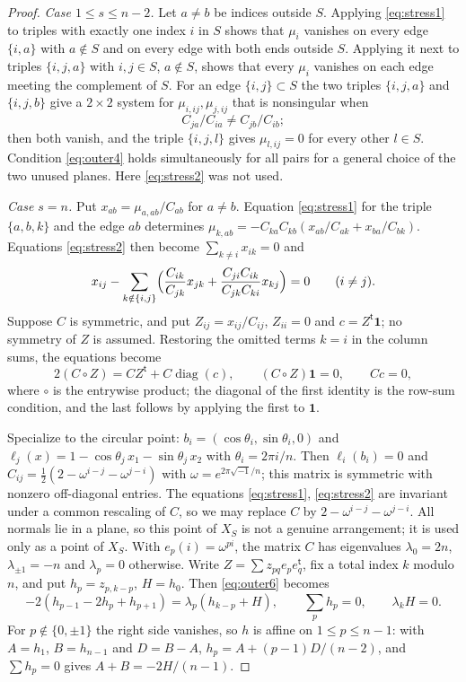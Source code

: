 \documentclass{amsart}
\theoremstyle{definition}
\theoremstyle{remark}
\numberwithin{equation}{section}
\begin{document}
\begin{proof}
\emph{Case $1\le s\le n-2$.} Let $a\ne b$ be indices outside $S$. Applying
\eqref{eq:stress1} to triples with exactly one index $i$ in $S$ shows that $\mu_i$
vanishes on every edge $\{i,a\}$ with $a\notin S$ and on every edge with both ends
outside $S$. Applying it next to triples $\{i,j,a\}$ with $i,j\in S$, $a\notin S$,
shows that every $\mu_i$ vanishes on each edge meeting the complement of $S$. For an
edge $\{i,j\}\subset S$ the two triples $\{i,j,a\}$ and $\{i,j,b\}$ give a $2\times2$
system for $\mu_{i,ij},\mu_{j,ij}$ that is nonsingular when
\begin{equation}\label{eq:outer4}
  C_{ja}/C_{ia}\ne C_{jb}/C_{ib};
\end{equation}
then both vanish, and the triple $\{i,j,l\}$ gives $\mu_{l,ij}=0$ for every other
$l\in S$. Condition \eqref{eq:outer4} holds simultaneously for all pairs for a general
choice of the two unused planes. Here \eqref{eq:stress2} was not used.

\emph{Case $s=n$.} Put $x_{ab}=\mu_{a,ab}/C_{ab}$ for $a\ne b$. Equation
\eqref{eq:stress1} for the triple $\{a,b,k\}$ and the edge $ab$ determines
$\mu_{k,ab}=-C_{ka}C_{kb}(x_{ab}/C_{ak}+x_{ba}/C_{bk})$. Equations \eqref{eq:stress2}
then become $\sum_{k\ne i}x_{ik}=0$ and
\[
  x_{ij}-\sum_{k\notin\{i,j\}}\Bigl(\frac{C_{ik}}{C_{jk}}x_{jk}
    +\frac{C_{ji}C_{ik}}{C_{jk}C_{ki}}x_{kj}\Bigr)=0\qquad(i\ne j).
\]
Suppose $C$ is symmetric, and put $Z_{ij}=x_{ij}/C_{ij}$, $Z_{ii}=0$ and
$c=Z^{\mathsf t}\mathbf 1$; no symmetry of $Z$ is assumed. Restoring the omitted terms
$k=i$ in the column sums, the equations become
\begin{equation}\label{eq:outer6}
  2(C\circ Z)=CZ^{\mathsf t}+C\operatorname{diag}(c),\qquad (C\circ Z)\mathbf1=0,\qquad
  Cc=0,
\end{equation}
where $\circ$ is the entrywise product; the diagonal of the first identity is the
row-sum condition, and the last follows by applying the first to $\mathbf1$.

Specialize to the circular point: $b_i=(\cos\theta_i,\sin\theta_i,0)$ and
$\ell_j(x)=1-\cos\theta_j\,x_1-\sin\theta_j\,x_2$ with $\theta_i=2\pi i/n$. Then
$\ell_i(b_i)=0$ and $C_{ij}=\tfrac12(2-\omega^{i-j}-\omega^{j-i})$ with
$\omega=e^{2\pi\sqrt{-1}/n}$; this matrix is symmetric with nonzero off-diagonal
entries. The equations \eqref{eq:stress1}, \eqref{eq:stress2} are invariant under a
common rescaling of $C$, so we may replace $C$ by $2-\omega^{i-j}-\omega^{j-i}$. All
normals lie in a plane, so this point of $X_S$ is not a genuine arrangement; it is
used only as a point of $X_S$. With $e_p(i)=\omega^{pi}$, the matrix $C$ has
eigenvalues $\lambda_0=2n$, $\lambda_{\pm1}=-n$ and $\lambda_p=0$ otherwise. Write
$Z=\sum z_{pq}e_pe_q^{\mathsf t}$, fix a total index $k$ modulo $n$, and put
$h_p=z_{p,k-p}$, $H=h_0$. Then \eqref{eq:outer6} becomes
\begin{equation}\label{eq:outer9}
  -2(h_{p-1}-2h_p+h_{p+1})=\lambda_p(h_{k-p}+H),\qquad \sum_ph_p=0,\qquad
  \lambda_kH=0 .
\end{equation}
For $p\notin\{0,\pm1\}$ the right side vanishes, so $h$ is affine on $1\le p\le n-1$:
with $A=h_1$, $B=h_{n-1}$ and $D=B-A$,
$h_p=A+(p-1)D/(n-2)$, and $\sum h_p=0$ gives $A+B=-2H/(n-1)$.


\end{proof}
\end{document}

